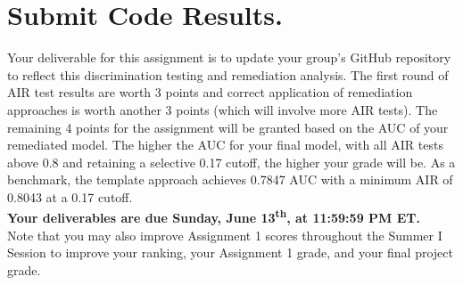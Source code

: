 \documentclass[fleqn]{article}
\begin{document}
\section{Submit Code Results.}

Your deliverable for this assignment is to update your group's GitHub repository to reflect this discrimination testing and remediation analysis. The first round of AIR test results are worth 3 points and correct application of remediation approaches is worth another 3 points (which will involve more AIR tests). The remaining 4 points for the assignment will be granted based on the AUC of your remediated model. The higher the AUC for your final model, with all AIR tests above 0.8 and retaining a selective 0.17 cutoff, the higher your grade will be. As a benchmark, the template approach achieves 0.7847 AUC with a minimum AIR of 0.8043 at a 0.17 cutoff.\\

\noindent \textbf{Your deliverables are due Sunday, June 13\textsuperscript{th}, at 11:59:59 PM ET.}\\

\noindent Note that you may also improve Assignment 1 scores throughout the Summer I Session to improve your ranking, your Assignment 1 grade, and your final project grade.
\end{document}
